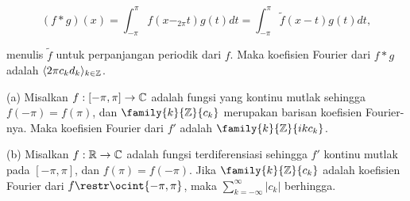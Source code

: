 $$(f*g)(x)=\int_{-\pi}^{\pi}f(x-_{2\pi}t)g(t)dt
=\int_{-\pi}^{\pi}\tilde f(x-t)g(t)dt,$$

\noindent{} menulis $\tilde f$ untuk perpanjangan periodik
dari $f$.   Maka koefisien Fourier dari $f*g$
adalah $\langle 2\pi c_kd_k\rangle_{k\in\Bbb Z}$.


 (a) Misalkan $f:[-\pi,\pi]\to\Bbb C$ adalah fungsi
yang kontinu mutlak sehingga $f(-\pi)=f(\pi)$, dan
$\family{k}{\Bbb Z}{c_k}$ merupakan barisan koefisien Fourier-nya.   Maka
koefisien Fourier dari $f'$ adalah $\family{k}{\Bbb Z}{ikc_k}$.

(b)
Misalkan $f:\Bbb R\to\Bbb C$ adalah fungsi terdiferensiasi sehingga $f'$
kontinu mutlak pada $[-\pi,\pi]$, dan $f(\pi)=f(-\pi)$.
Jika $\family{k}{\Bbb Z}{c_k}$ adalah koefisien Fourier dari
$f\restr\ocint{-\pi,\pi}$, maka
$\sum_{k=-\infty}^{\infty}|c_k|$ berhingga.

